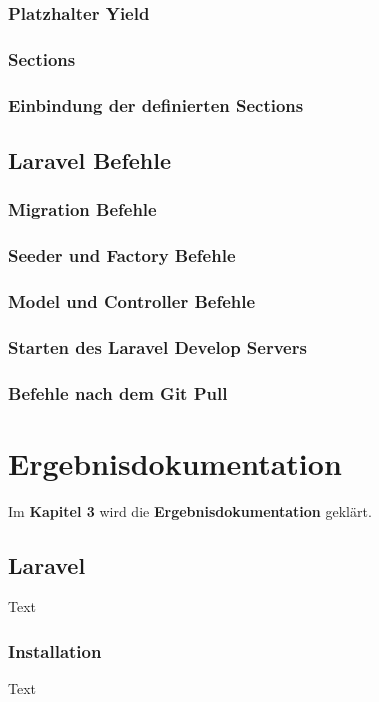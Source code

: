 \subsection{Platzhalter Yield}

\subsection{Sections}
\subsection{Einbindung der definierten Sections}


\section{Laravel Befehle}

\subsection{Migration Befehle}
\subsection{Seeder und Factory Befehle}
\subsection{Model und Controller Befehle}
\subsection{Starten des Laravel Develop Servers}
\subsection{Befehle nach dem Git Pull} 



\chapter{Ergebnisdokumentation }
Im \textbf{Kapitel 3} wird die \textbf{Ergebnisdokumentation} geklärt.

\section{Laravel }
Text

\subsection{Installation}
Text

